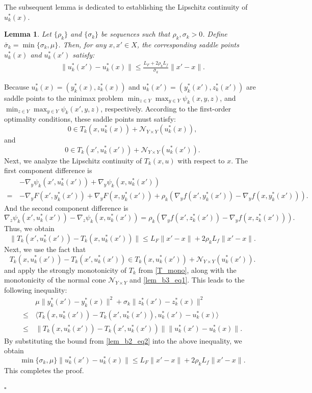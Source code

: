 \documentclass{article}
\newtheorem{lemma}[theorem]{Lemma}
\newenvironment{proof}[1][Proof]{\par
	\normalfont\topsep6pt\relax
	\trivlist\item[\hskip\labelsep\itshape #1.]\ignorespaces
}{%
	\hfill\ensuremath{\square}\endtrivlist
}
\begin{document}
	
     The subsequent lemma is dedicated to establishing the Lipschitz continuity of $u_{k}^*(x)$.
	 \begin{lemma}\label{uxk+1xk}
	 	Let $\{\rho_k\}$ and $\{\sigma_k\}$ be sequences such that $ \rho_{k}, \sigma_{k} >0$. Define $\bar{\sigma}_k = \min\{\sigma_k, \mu\}$. Then, for any $x, x'\in X$, the corresponding saddle points $u^*_k(x)$ and $u^*_k(x')$ satisfy:
	 	\begin{align}\label{uxk+1xkequ}
	 		\|u^*_k(x')-u^*_k(x)\|\le\frac{L_{F}+2\rho_kL_{f}}{\bar{\sigma}_k}\|x'-x\|.
	 	\end{align}
        \end{lemma}
	 \begin{proof}
Because $u^*_k(x) = (y_{k}^*(x), z_{k}^*(x))$ and $u^*_k(x') = (y_{k}^*(x'), z_{k}^*(x'))$ are saddle points to the minimax problem $\min_{z \in {Y}} \max_{ y \in {Y}}\psi_{k}(x, y, z)$, and $\min_{z \in {Y}} \max_{ y \in {Y}}\psi_{k}(x', y, z)$, respectively. According to the first-order optimality conditions, these saddle points must satisfy:
\begin{equation}\label{lem_b2_eq1}
    0 \in T_k(x,u^*_k(x)) + \mathcal{N}_{Y \times Y}(u^*_k(x)),
\end{equation}
and 
\[
0 \in T_{k}(x',u^*_{k}(x')) + \mathcal{N}_{Y \times Y}(u^*_{k}(x')).
\]
Next, we analyze the Lipschitz continuity of $ T_{k}(x,u)$ with respect to $x$.
The first component difference is
\[
\begin{aligned}
    &-\nabla_y \psi_{k}(x',u^*_{k}(x')) + \nabla_y \psi_{k}(x,u^*_{k}(x')) \\
    =\, & - \nabla_y F(x',y_{k}^*(x')) + \nabla_y F(x,y_{k}^*(x')) + \rho_{k} \left( \nabla_y f(x',y_{k}^*(x')) - \nabla_y f(x,y_{k}^*(x')) \right).
\end{aligned}
\]
And the second component difference is
\[
    \nabla_z \psi_{k}(x', u^*_{k}(x')) - \nabla_z \psi_{k}(x,u^*_{k}(x')) =  \rho_k \left( \nabla_y f(x',z_{k}^*(x')) - \nabla_y f(x,z_{k}^*(x')) \right).
\]
Thus, we obtain
\begin{equation}\label{lem_b2_eq2}
\|T_{k}(x' ,u^*_{k}(x')) - T_{k}(x,u^*_{k}(x')) \| \le L_F\| x' - x\| + 2 \rho_k L_f\|x'-x\|.
\end{equation}
Next, we use the fact that
\[
 T_{k}(x,u^*_{k}(x')) - T_{k}(x',u^*_{k}(x')) \in T_{k}(x,u^*_{k}(x')) + \mathcal{N}_{Y \times Y}(u^*_{k}(x')).
\]
and apply the strongly monotonicity of $T_k$ from \eqref{T_mono}, along with the monotonicity of the normal cone $\mathcal{N}_{Y \times Y}$ and  \eqref{lem_b3_eq1}. This leads to the following inequality:
\[
\begin{aligned}
     &\mu\| y_{k}^*(x') - y_{k}^*(x)\|^2 + \sigma_k\|z_{k}^*(x') - z_{k}^*(x)\|^2 \\ \le\,& \langle T_{k}(x,u^*_{k}(x')) - T_{k}(x',u^*_{k}(x')), u^*_{k}(x') - u^*_{k}(x) \rangle \\
     \le \, &\|T_{k}(x,u^*_{k}(x')) - T_{k}(x',u^*_{k}(x')) \| \|   u^*_{k}(x') - u^*_{k}(x)\|.
\end{aligned}
\]
By substituting the bound from \eqref{lem_b2_eq2} into the above inequality, we obtain
\[
     \min\{\sigma_k, \mu\} \| u_{k}^*(x') - u_{k}^*(x)\| \le L_F\| x' - x\| + 2 \rho_k L_f\|x'-x\|.
\]
This completes the proof.



\end{proof}
\end{document}

